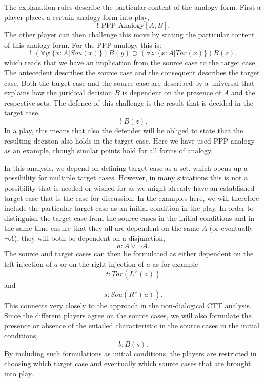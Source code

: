 			The explanation rules describe the particular content of the analogy form. First a player places a certain analogy form into play,
			 	\[
			 		\text{! PPP-Analogy}[A,B].
			 	\]
			The other player can then challenge this move by stating the particular content of this analogy form. For the PPP-analogy this is:
				\[
					\text{! } (\forall y: \{ x: A| Sou(x)\} ) B(y) \supset (\forall z : \{ x: A| Tar(x)\} ) B(z).
				\]
				which reads that we have an implication from the source case to the target case. The antecedent describes the source case and the consequent describes the target case. Both the target case and the source case are described by a universal that explains how the juridical decision $B$ is dependent on the presence of $A$ and the respective sets. The defence of this challenge is the result that is decided in the target case,
				\[
					\text{! } B(z).
				\]
			In a play, this means that also the defender will be obliged to state that the resulting decision also holds in the target case. Here we have used PPP-analogy as an example, though similar points hold for all forms of analogy. 
			
			In this analysis, we depend on defining target case as a set, which opens up a possibility for multiple target cases. However, in many situations this is not a possibility that is needed or wished for as we might already have an established target case that is the case for discussion. In the examples here, we will therefore include the particular target case as an initial condition in the play. In order to distinguish the target case from the source cases in the initial conditions and in the same time ensure that they all are dependent on the same $A$ (or eventually $\neg A$), they will both be dependent on a disjunction,
				\[
					a : A \lor \neg A.
				\]
			The source and target cases can then be formulated as either dependent on the left injection of $a$ or on the right injection of $a$ as for example 
				\[
					t : Tar(L^\lor (a))
				\]
			and
				\[
					s : Sou(R^\lor (a)).
				\]
			This connects very closely to the approach in the non-dialogical CTT analysis. Since the different players agree on the source cases, we will also formulate the presence or absence of the entailed characteristic in the source cases in the initial conditions,
				\[
					b : B(s).
				\]
			By including such formulations as initial conditions, the players are restricted in choosing which target case and eventually which source cases that are brought into play. 
		
